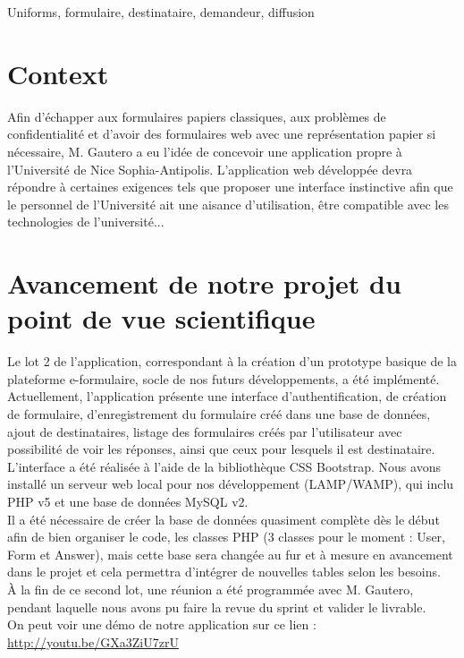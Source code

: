 \documentclass{sigplanconf}
\begin{document}
\keywords
Uniforms, formulaire, destinataire, demandeur, diffusion

\section{Context}
Afin d'\'echapper aux formulaires papiers classiques, aux probl\`emes de confidentialit\'e et d'avoir des formulaires web avec une repr\'esentation papier si n\'ecessaire, M. Gautero a eu l'id\'ee de concevoir une application propre \`a l'Universit\'e de Nice Sophia-Antipolis. L'application web d\'evelopp\'ee devra r\'epondre \`a certaines exigences tels que proposer une interface instinctive afin que le personnel de l'Universit\'e ait une aisance d'utilisation, \^etre compatible avec les technologies de l'universit\'e...


\section{Avancement de notre projet du point de vue scientifique}
Le lot 2 de l'application, correspondant \`a la cr\'eation d'un prototype basique de la plateforme e-formulaire, socle de nos futurs d\'eveloppements, a \'et\'e impl\'ement\'e.\\ 
Actuellement, l'application pr\'esente une interface d'authentification, de cr\'eation de formulaire, d'enregistrement du formulaire cr\'e\'e dans une base de donn\'ees, ajout de destinataires, listage des formulaires cr\'e\'es par l'utilisateur avec possibilit\'e de voir les r\'eponses, ainsi que ceux pour lesquels il est destinataire.\\
L'interface a \'et\'e réalis\'ee \`a l'aide de la biblioth\`eque CSS Bootstrap. Nous avons install\'e un serveur web local pour nos d\'eveloppement (LAMP/WAMP), qui inclu PHP v5 et une base de données MySQL v2.\\
Il a \'et\'e n\'ecessaire de cr\'eer la base de donn\'ees quasiment compl\`ete d\`es le d\'ebut afin de bien organiser le code, les classes PHP (3 classes pour le moment : User, Form et Answer), mais cette base sera chang\'ee au fur et \`a mesure en avancement dans le projet et cela permettra d'int\'egrer de nouvelles tables selon les besoins.\\
\`A la fin de ce second lot, une r\'eunion a \'et\'e programm\'ee avec M. Gautero, pendant laquelle nous avons pu faire la revue du sprint et valider le livrable.\\
On peut voir une d\'emo de notre application sur ce lien : \url{http://youtu.be/GXa3ZiU7zrU}
\end{document}
